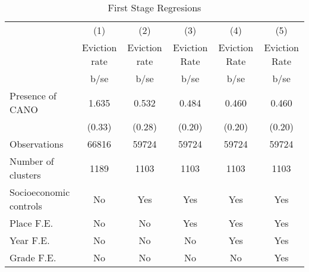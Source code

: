 \begin{table}[htbp]\centering
\def\sym#1{\ifmmode^{#1}\else\(^{#1}\)\fi}
\caption{First Stage Regresions}
\begin{tabular}{l*{5}{c}}
\hline\hline
                    &\multicolumn{1}{c}{(1)}&\multicolumn{1}{c}{(2)}&\multicolumn{1}{c}{(3)}&\multicolumn{1}{c}{(4)}&\multicolumn{1}{c}{(5)}\\
                    &Eviction rate&Eviction rate&Eviction Rate&Eviction Rate&Eviction Rate\\
                    &        b/se&        b/se&        b/se&        b/se&        b/se\\
\hline
Presence of CANO    &       1.635&       0.532&       0.484&       0.460&       0.460\\
                    &      (0.33)&      (0.28)&      (0.20)&      (0.20)&      (0.20)\\
\hline
Observations        &       66816&       59724&       59724&       59724&       59724\\
Number of clusters  &        1189&        1103&        1103&        1103&        1103\\
Socioeconomic controls&          No&         Yes&         Yes&         Yes&         Yes\\
Place F.E.          &          No&          No&         Yes&         Yes&         Yes\\
Year F.E.           &          No&          No&          No&         Yes&         Yes\\
Grade F.E.          &          No&          No&          No&          No&         Yes\\
\hline\hline
\end{tabular}
\end{table}
